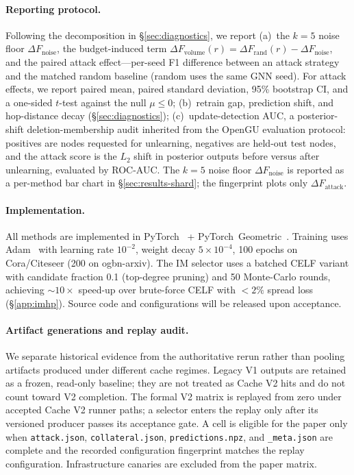 \paragraph{Reporting protocol.}
Following the decomposition in \S\ref{sec:diagnostics}, we report
(a)~the $k{=}5$ noise floor $\Delta F_{\text{noise}}$, the
budget-induced term
$\Delta F_{\text{volume}}(r)=\Delta F_{\text{rand}}(r)-\Delta F_{\text{noise}}$,
and the paired attack effect---per-seed F1 difference between an attack
strategy and the matched random baseline (random uses the same GNN
seed). For attack effects, we report paired mean, paired standard
deviation, 95\% bootstrap CI, and a one-sided $t$-test against the null
$\mu\le 0$;
(b)~retrain gap, prediction shift, and hop-distance decay
(\S\ref{sec:diagnostics});
(c)~update-detection AUC, a posterior-shift deletion-membership audit
inherited from the OpenGU evaluation protocol: positives are nodes
requested for unlearning, negatives are held-out test nodes, and the
attack score is the $L_2$ shift in posterior outputs before versus after
unlearning, evaluated by ROC-AUC.
The $k{=}5$ noise floor $\Delta F_{\text{noise}}$ is reported as a
per-method bar chart in \S\ref{sec:results-shard}; the fingerprint plots
only $\Delta F_{\text{attack}}$.

\paragraph{Implementation.}
All methods are implemented in PyTorch~\cite{paszke2019pytorch} +
PyTorch~Geometric~\cite{fey2019fast}. Training uses
Adam~\cite{kingma2015adam} with learning rate $10^{-2}$, weight decay
$5\times10^{-4}$, 100 epochs on Cora/Citeseer (200 on ogbn-arxiv). The IM selector uses a
batched CELF variant with candidate fraction 0.1 (top-degree
pruning) and 50 Monte-Carlo rounds, achieving ${\sim}10\times$
speed-up over brute-force CELF with $<2\%$ spread loss
(\S\ref{app:imhp}). Source code and configurations will be released upon
acceptance.

\paragraph{Artifact generations and replay audit.}
We separate historical evidence from the authoritative rerun rather than
pooling artifacts produced under different cache regimes. Legacy V1
outputs are retained as a frozen, read-only baseline; they are not treated
as Cache V2 hits and do not count toward V2 completion. The formal V2
matrix is replayed from zero under accepted Cache V2 runner paths; a
selector enters the replay only after its versioned producer passes its
acceptance gate. A cell is eligible for the paper only when \texttt{attack.json},
\texttt{collateral.json}, \texttt{predictions.npz}, and
\texttt{\_meta.json} are complete and the recorded configuration
fingerprint matches the replay configuration. Infrastructure canaries are
excluded from the paper matrix.

